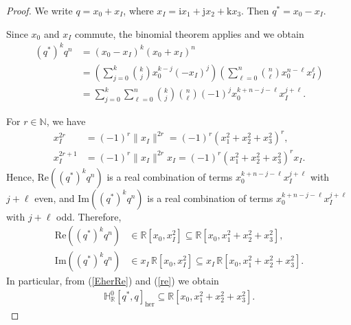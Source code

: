 \documentclass[10pt,a4paper]{amsart}
\begin{document}
\begin{proof}
We write $q=x_{0}+x_{I}$, where
$x_{I}=\mathrm{i}x_{1}+\mathrm{j}x_{2}+\mathrm{k}x_{3}$. Then
$q^{*}=x_{0}-x_{I}$.

Since $x_{0}$ and $x_{I}$ commute, the binomial theorem applies and we
obtain
%
\begin{align*}
(q^{*})^{k}q^{n} &= (x_{0}-x_{I})^{k}(x_{0}+x_{I})^{n}
\\
&=\left (\sum _{j=0}^{k}\binom{k}{j} x_{0}^{k-j}(-x_{I})^{j}\right )
\left (\sum _{\ell =0}^{n}\binom{n}{\ell} x_{0}^{n-\ell}x_{I}^{\ell}
\right )
\\
&= \sum _{j=0}^{k} \sum _{\ell =0}^{n} \binom{k}{j}\binom{n}{\ell} (-1)^{j}
x_{0}^{k+n-j-\ell} x_{I}^{j+\ell}.
\end{align*}

For $r\in \mathbb{N}$, we have
%
\begin{align*}
x_{I}^{2r}&=(-1)^{r}\|x_{I}\|^{2r} = (-1)^{r}(x_{1}^{2}+x_{2}^{2}+x_{3}^{2})^{r},
\\
x_{I}^{2r+1}&=(-1)^{r}\|x_{I}\|^{2r} x_{I} = (-1)^{r}(x_{1}^{2}+x_{2}^{2}+x_{3}^{2})^{r}
x_{I}.
\end{align*}
%
Hence, $\mathrm{Re}((q^{*})^{k}q^{n})$ is a real combination of terms
$x_{0}^{k+n-j-\ell}x_{I}^{j+\ell}$ with $j+\ell $ even, and
$\mathrm{Im}((q^{*})^{k}q^{n})$ is a real combination of terms
$x_{0}^{k+n-j-\ell}x_{I}^{j+\ell}$ with $j+\ell $ odd. Therefore,
%
\begin{align}
\label{re}
\mathrm{Re}((q^{*})^{k}q^{n}) & \in \mathbb{R}[x_{0},x_{I}^{2}]
\subseteq \mathbb{R}[x_{0},x_{1}^{2}+x_{2}^{2}+x_{3}^{2}],
\\
\mathrm{Im}((q^{*})^{k}q^{n}) & \in x_{I} \, \mathbb{R}[x_{0},x_{I}^{2}]
\subseteq x_{I} \, \mathbb{R}[x_{0},x_{1}^{2}+x_{2}^{2}+x_{3}^{2}].
\label{im}
\end{align}
%
In particular, from (\ref{EherRe}) and (\ref{re}) we obtain
%
\begin{align}
\label{hrinclusion}
\mathbb{H}^{0}_{\mathbb R}[q^{*}, q]_{\mathrm{her}} \subseteq
\mathbb{R}[x_{0},x_{1}^{2}+x_{2}^{2}+x_{3}^{2}].
\end{align}


\end{proof}
\end{document}
